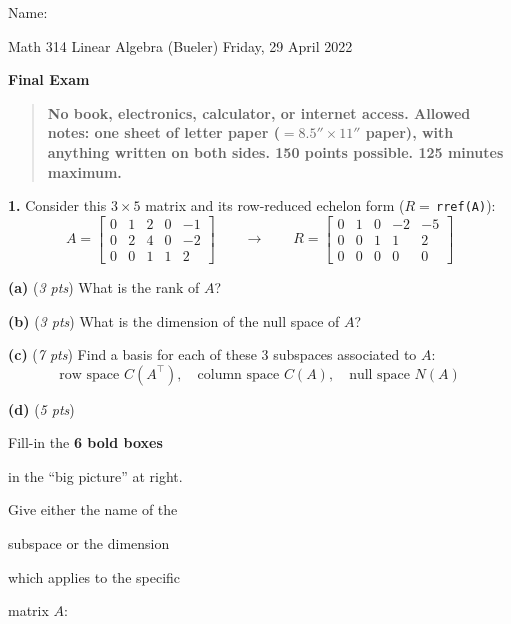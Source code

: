 \documentclass[11pt]{amsart}
\newcommand{\prob}[1]{\bigskip\noindent\textbf{#1.} }
\newcommand{\pts}[1]{(\emph{#1 pts})}
\newcommand{\epartpts}[2]{\medskip\noindent \textbf{(#1)} \pts{#2} \quad}
\begin{document}
\hfill \Large Name:\underline{\phantom{Ed Bueler really really long long long name}}
\medskip

\scriptsize \noindent Math 314 Linear Algebra (Bueler) \hfill Friday, 29 April 2022
\medskip

\LARGE\centerline{\textbf{Final Exam}}

\smallskip
\begin{quote}
\large
\textbf{No book, electronics, calculator, or internet access.  Allowed notes: one sheet of letter paper ($=8.5''\times 11''$ paper), with anything written on both sides.  150 points possible.  125 minutes maximum.}
\end{quote}

\normalsize
\medskip

\thispagestyle{empty}

\prob{1}  Consider this $3\times 5$ matrix and its row-reduced echelon form ($R=$\,\texttt{rref(A)}):
    $$A = \begin{bmatrix} 0 & 1 & 2 & 0 & -1 \\
                          0 & 2 & 4 & 0 & -2 \\
                          0 & 0 & 1 & 1 & 2 \end{bmatrix}
      \qquad \to \qquad
      R = \begin{bmatrix} 0 & 1 & 0 & -2 & -5 \\
                          0 & 0 & 1 & 1 & 2 \\
                          0 & 0 & 0 & 0 & 0 \end{bmatrix}$$

\medskip
\epartpts{a}{3}  What is the rank of $A$?
\bigskip\medskip

\epartpts{b}{3}  What is the dimension of the null space of $A$?
\bigskip\medskip

\epartpts{c}{7}  Find a basis for each of these 3 subspaces associated to $A$:
    $$\text{row space } C(A^\top), \quad \text{column space } C(A), \quad \text{null space } N(A)$$
\vfill

\epartpts{d}{5}  

\noindent Fill-in the \textbf{6 bold boxes}

\noindent in the ``big picture'' at right.

\noindent Give either the name of the

\noindent subspace or the dimension

\noindent which applies to the specific

\noindent matrix $A$:
\end{document}
